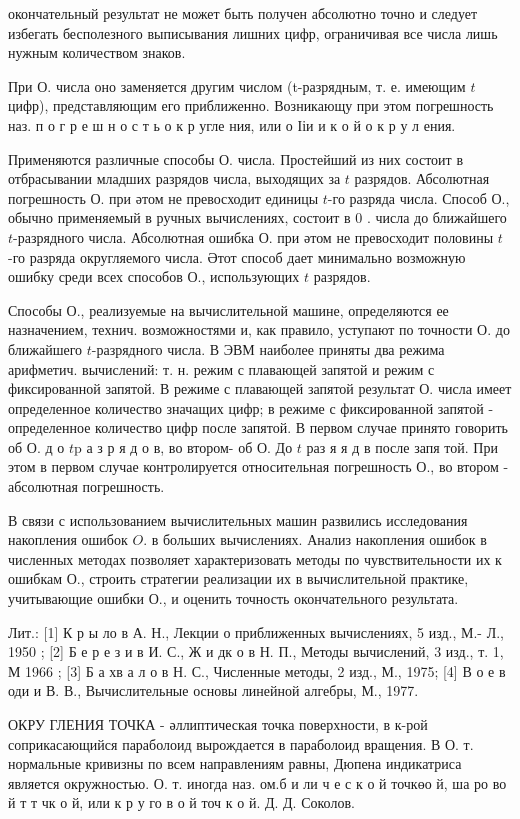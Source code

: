 \documentclass[10pt]{article}
\begin{document}
окончательный результат не может быть получен абсолютно точно и следует избегать бесполезного выписывания лишних цифр, ограничивая все числа лишь нужным количеством знаков.

При О. числа оно заменяется другим числом (t-разрядным, т. е. имеющим $t$ цифр), представляющим его приближенно. Возникающу при этом погрешность наз. п о г р е ш н о с т ь о к р угле ния, или о Ііи и к о й о к р у л ения.

Применяются различные способы О. числа. Простейший из них состоит в отбрасывании младших разрядов числа, выходящих за $t$ разрядов. Абсолютная погрешность О. при әтом не превосходит единицы $t$-го разряда числа. Способ О., обычно применяемый в ручных вычислениях, состоит в 0 . числа до ближайшего $t$-разрядного числа. Абсолютная ошибка О. при әтом не превосходит половины $t$-го разряда округляемого числа. Әтот способ дает минимально возможную ошибку среди всех способов О., использующих $t$ разрядов.

Способы О., реализуемые на вычислительной машине, определяются ее назначением, технич. возможностями и, как правило, уступают по точности О. до ближайшего $t$-разрядного числа. В ЭВМ наиболее приняты два режима арифметич. вычислений: т. н. режим с плавающей запятой и режим с фиксированной запятой. В режиме с плавающей запятой результат О. числа имеет определенное количество значащих цифр; в режиме с фиксированной запятой - определенное количество цифр после запятой. В первом случае принято говорить об О. д о $t \mathrm{p}$ а з р я д о в, во втором- об О. До $t$ раз я я д в после запя той. При этом в первом случае контролируется относительная погрешность О., во втором - абсолютная погрешность.

В связи с использованием вычислительных машин развились исследования накопления ошибок $O$. в больших вычислениях. Анализ накопления ошибок в численных методах позволяет характеризовать методы по чувствительности их к ошибкам О., строить стратегии реализации их в вычислительной практике, учитывающие ошибки О., и оценить точность окончательного результата.

Лит.: [1] К р ы ло в А. Н., Лекции о приближенных вычислениях, 5 изд., М.- Л., 1950 ; [2] Б е р е з и в И. С., Ж и дк о в Н. П., Методы вычислений, 3 изд., т. 1, М 1966 ; [3] Б а хв а л о в Н. С., Численные методы, 2 изд., М., 1975; [4] В о е в оди и В. В., Вычислительные основы линейной алгебры, М.,
1977.

ОКРУ ГЛЕНИЯ ТОЧКА - әллиптическая точка поверхности, в к-рой соприкасающийся параболоид вырождается в параболоид вращения. В О. т. нормальные кривизны по всем направлениям равны, Дюпена индикатриса является окружностью. О. т. иногда наз. ом.б и ли ч е с к о й точкөо й, ша ро во й т т чк о й, или к р у го в о й точ к о й. Д. Д. Соколов.
\end{document}
